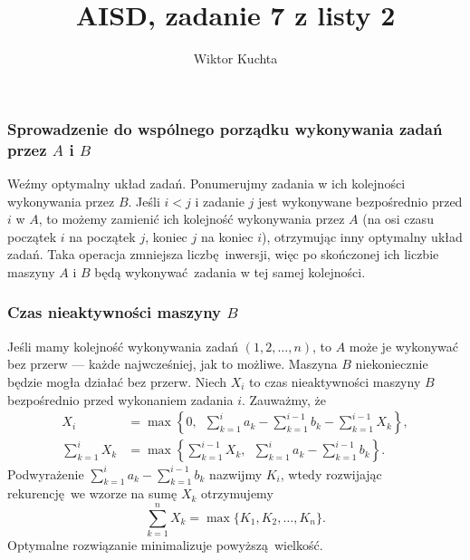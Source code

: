 \documentclass[a4paper, 12pt]{article}
\title{AISD, zadanie 7 z listy 2}
\author{Wiktor Kuchta}
\date{\vspace{-4ex}}
\newcommand{\+}{\enspace}
\begin{document}
\maketitle

\iffalse
\section*{2/6}
Jeśli $e$ nie jest maksymalnej wagi na żadnym cyklu, to należy do pewnego MST:

Jeśli nie leży na żadnym cyklu, to musi należeć do MST.

Załóżmy, że krawędź $e$ nie jest maksymalna na żadnym cyklu,
ale leży na jakimś cyklu.
Załóżmy nie wprost, że $e$ nie należy do MST.
Wtedy możemy dodać krawedź $e$ do MST, tworząc cykl.
Jest na nim krawędź o wadze większej niż $e$, zatem możemy
stworzyć MST o mniejszym koszcie usuwająć ją a dodając $e$.
Sprzeczność.

Usuńmy $e=(v,w)$ i wszystkie krawędzie o wadze większej niż $e$ z grafu.
Jeśli $w$ jest nieosiągalny z $v$, to albo graf się rozspójnił, albo $e$ nie jest
maksymalny na żadnym cyklu, więc w obu przypadkach $e$ należy do pewnego MST.

Jeśli $w$ jest osiągalny z $v$, to $e$ jest maksymalny na pewnym cyklu,
więc nie należy do MST.
\fi

\subsubsection*{Sprowadzenie do wspólnego porządku wykonywania zadań przez $A$ i $B$}
Weźmy optymalny układ zadań.
Ponumerujmy zadania w ich kolejności wykonywania przez $B$.
Jeśli $i < j$ i zadanie $j$ jest wykonywane bezpośrednio przed $i$ w $A$,
to możemy zamienić ich kolejność wykonywania przez $A$
(na osi czasu początek $i$ na początek $j$, koniec $j$ na koniec $i$),
otrzymując inny optymalny układ zadań.
Taka operacja zmniejsza liczbę inwersji, więc po skończonej ich liczbie
maszyny $A$ i $B$ będą wykonywać zadania w tej samej kolejności.

\subsubsection*{Czas nieaktywności maszyny $B$}
Jeśli mamy kolejność wykonywania zadań $(1, 2, …, n)$,
to $A$ może je wykonywać
bez przerw --- każde najwcześniej, jak to możliwe.
Maszyna $B$ niekoniecznie będzie mogła działać bez przerw.
Niech $X_i$ to czas nieaktywności maszyny $B$ bezpośrednio
przed wykonaniem zadania $i$.
Zauważmy, że
\begin{align*}
	X_i &= \max \left\{ 0,\+  ∑_{k=1}^i a_k - ∑_{k=1}^{i-1} b_k - ∑_{k=1}^{i-1} X_k \right\}, \\
	∑_{k=1}^i X_k &= \max \left\{ ∑_{k=1}^{i-1} X_k ,\+  ∑_{k=1}^i a_k - ∑_{k=1}^{i-1} b_k\right\}.
\end{align*}
Podwyrażenie $∑_{k=1}^i a_k - ∑_{k=1}^{i-1} b_k$ nazwijmy $K_i$,
wtedy rozwijając rekurencję we wzorze na sumę $X_k$ otrzymujemy
$$∑_{k=1}^n X_k = \max \{ K_1, K_2, …, K_n \}.$$
Optymalne rozwiązanie minimalizuje powyższą wielkość.
\end{document}
